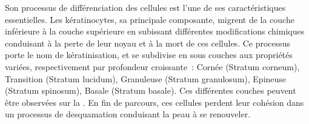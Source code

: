 \addtocounter{footnote}{1}

Son processus de différenciation des cellules est l’une de ses caractéristiques essentielles. Les kératinocytes, sa principale composante, migrent de la couche inférieure à la couche supérieure en subissant différentes modifications chimiques conduisant à la perte de leur noyau et à la mort de ces cellules. Ce processus porte le nom de kératinisation, et se subdivise en sous couches aux propriétés variées, respectivement par profondeur croissante~: Cornée (Stratum corneum), Transition (Stratum lucidum), Granuleuse (Stratum granulosum), Epineuse (Stratum spinosum), Basale (Stratum basale). Ces différentes couches peuvent être observées sur la . En fin de parcours, ces cellules perdent leur cohésion dans un processus de desquamation conduisant la peau à se renouveler.\par
\clearpage

